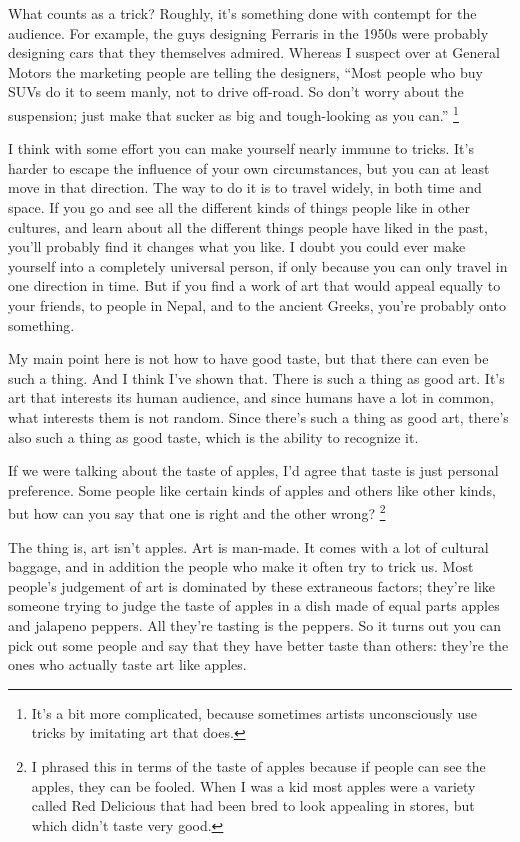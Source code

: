 \documentclass[12pt]{book}
\begin{document}
What counts as a trick? Roughly, it's something done with contempt for
the audience. For example, the guys designing Ferraris in the 1950s were
probably designing cars that they themselves admired. Whereas I suspect
over at General Motors the marketing people are telling the designers,
``Most people who buy SUVs do it to seem manly, not to drive off-road.
So don't worry about the suspension; just make that sucker as big and
tough-looking as you can.'' \footnote{It's a bit more complicated, because sometimes artists
unconsciously use tricks by imitating art that does.}

I think with some effort you can make yourself nearly immune to tricks.
It's harder to escape the influence of your own circumstances, but you
can at least move in that direction. The way to do it is to travel
widely, in both time and space. If you go and see all the different
kinds of things people like in other cultures, and learn about all the
different things people have liked in the past, you'll probably find it
changes what you like. I doubt you could ever make yourself into a
completely universal person, if only because you can only travel in one
direction in time. But if you find a work of art that would appeal
equally to your friends, to people in Nepal, and to the ancient Greeks,
you're probably onto something.

My main point here is not how to have good taste, but that there can
even be such a thing. And I think I've shown that. There is such a thing
as good art. It's art that interests its human audience, and since
humans have a lot in common, what interests them is not random. Since
there's such a thing as good art, there's also such a thing as good
taste, which is the ability to recognize it.

If we were talking about the taste of apples, I'd agree that taste is
just personal preference. Some people like certain kinds of apples and
others like other kinds, but how can you say that one is right and the
other wrong? \footnote{I phrased this in terms of the taste of apples because if people
can see the apples, they can be fooled. When I was a kid most apples
were a variety called Red Delicious that had been bred to look appealing
in stores, but which didn't taste very good.}

The thing is, art isn't apples. Art is man-made. It comes with a lot of
cultural baggage, and in addition the people who make it often try to
trick us. Most people's judgement of art is dominated by these
extraneous factors; they're like someone trying to judge the taste of
apples in a dish made of equal parts apples and jalapeno peppers. All
they're tasting is the peppers. So it turns out you can pick out some
people and say that they have better taste than others: they're the ones
who actually taste art like apples.
\end{document}
